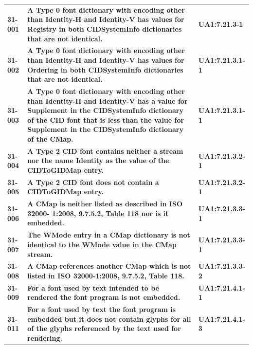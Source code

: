 \documentclass{book}
\begin{document}
\begin{longtable}{lp{10cm}l}
  \textbf{31-001} & \textbf{A Type 0 font dictionary with encoding other than Identity-H and Identity-V has values for Registry in both CIDSystemInfo dictionaries that are not identical.} & \textbf{UA1:7.21.3-1}\\

  \textbf{31-002} & \textbf{A Type 0 font dictionary with encoding other than Identity-H and Identity-V has values for Ordering in both CIDSystemInfo dictionaries that are not identical.} & \textbf{UA1:7.21.3.1-1}\\

  \textbf{31-003} & \textbf{A Type 0 font dictionary with encoding other than Identity-H and Identity-V has a value for Supplement in the CIDSystemInfo dictionary of the CID font that is less than the value for Supplement in the CIDSystemInfo dictionary of the CMap.} & \textbf{UA1:7.21.3.1-1}\\

  \textbf{31-004} & \textbf{A Type 2 CID font contains neither a stream nor the name Identity as the value of the CIDToGIDMap entry.} & \textbf{UA1:7.21.3.2-1}\\

  \textbf{31-005} & \textbf{A Type 2 CID font does not contain a CIDToGIDMap entry.} & \textbf{UA1:7.21.3.2-1}\\

  \textbf{31-006} & \textbf{A CMap is neither listed as described in ISO 32000- 1:2008, 9.7.5.2, Table 118 nor is it embedded.} & \textbf{UA1:7.21.3.3-1}\\

  \textbf{31-007} & \textbf{The WMode entry in a CMap dictionary is not identical to the WMode value in the CMap stream.} & \textbf{UA1:7.21.3.3-1}\\

  \textbf{31-008} & \textbf{A CMap references another CMap which is not listed in ISO 32000-1:2008, 9.7.5.2, Table 118.} & \textbf{UA1:7.21.3.3-2}\\

  \textbf{31-009} & \textbf{For a font used by text intended to be rendered the font program is not embedded.} & \textbf{UA1:7.21.4.1-1}\\

  \textbf{31-011} & \textbf{For a font used by text the font program is embedded but it does not contain glyphs for all of the glyphs referenced by the text used for rendering.} & \textbf{UA1:7.21.4.1-3}\\


\end{longtable}
\end{document}
